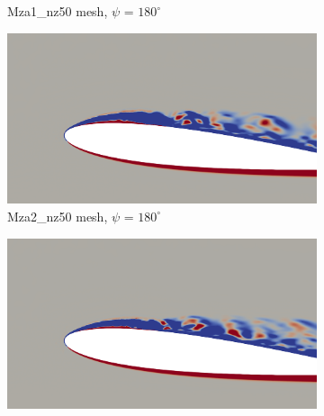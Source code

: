 \begin{figure}[H]
\begin{subfigure}[b]{0.475\textwidth}
		\caption{Mza1\_nz50 mesh, $\psi$ = $180^\circ$}
		\label{fig:Mza1_50_sp_psi180}
	\end{subfigure}
	\begin{subfigure}[b]{0.475\textwidth}
		\centering
		\includegraphics[width=1\textwidth]{figures/zonal_adapt_results/vorticity_plots/v2/Mza2_50/spavg/phase_180.png}
		\caption{Mza2\_nz50 mesh, $\psi$ = $180^\circ$}
		\label{fig:Mza2_50_sp_psi180}
	\end{subfigure}	
	\begin{subfigure}[b]{0.475\textwidth}
		\centering
		\includegraphics[width=1\textwidth]{figures/zonal_adapt_results/vorticity_plots/v2/Mza2_100/spavg/phase_180.png}

\end{subfigure}
\end{figure}
